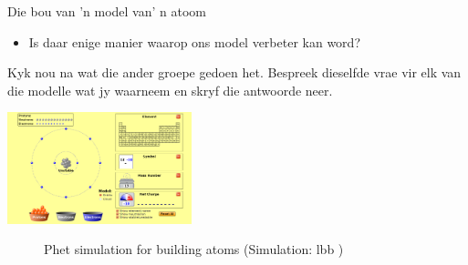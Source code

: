 \begin{groupdiscussion}{Die bou van 'n model van' n atoom}
\begin{multicols}{2}
\begin{itemize}[noitemsep]
\label{m38741*uid119}\item Is daar enige manier waarop ons model verbeter kan word?
\end{itemize}
        \label{m38741*id260596}Kyk nou na wat die ander groepe gedoen het. Bespreek dieselfde vrae vir elk van die modelle wat jy waarneem en skryf die antwoorde neer. \par 
\end{multicols}
\begin{center}
 \includegraphics[width=0.4\textwidth]{photos/BuildAtom.png}
\end{center}

\end{groupdiscussion}      
    \setcounter{subfigure}{0}
	\begin{figure}[H] %
    \textnormal{Phet simulation for building atoms} \nopagebreak
  \label{m38806*phet!!!underscore!!!sim}\label{m38806*phet-simulation}
             { (Simulation:  lbb )}
 \end{figure}       
            \nopagebreak
